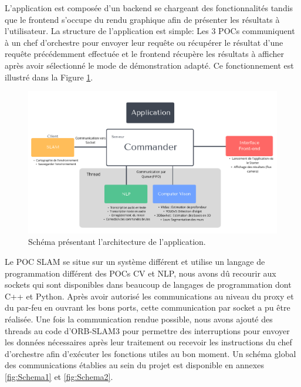 \documentclass[11pt]{article}
\begin{document}
        L'application est composée d'un backend se chargeant des fonctionnalités tandis que le frontend s'occupe du rendu
        graphique afin de présenter les résultats à l'utilisateur. La structure de l'application est simple: Les 3 POCs communiquent à un 
        chef d'orchestre pour envoyer leur requête ou récupérer le résultat d'une requête précédemment effectuée et le frontend récupère
        les résultats à afficher après avoir sélectionné le mode de démonstration adapté. Ce fonctionnement est illustré dans la 
        Figure \ref{fig:Structure}.

        \begin{figure}[hbt]  
          \includegraphics[width=\textwidth]{StructureApp.png}    
          \caption{Schéma présentant l'architecture de l'application.}
          \label{fig:Structure}
        \end{figure} 

        Le POC SLAM se situe sur un système différent et utilise un langage de programmation différent des POCs CV et NLP, nous avons dû
        recourir aux sockets qui sont disponibles dans beaucoup de langages de programmation dont C++ et Python. Après avoir autorisé les 
        communications au niveau du proxy et du par-feu en ouvrant les bons ports, cette communication par socket a pu être réalisée.
        Une fois la communication rendue possible, nous avons ajouté des threads au code d'ORB-SLAM3 pour permettre des interruptions
        pour envoyer les données nécessaires après leur traitement ou recevoir les instructions du chef d'orchestre
        afin d'exécuter les fonctions utiles au bon moment. Un schéma global des communications établies au sein du projet est disponible en 
        annexes \ref{fig:Schema1} et \ref{fig:Schema2}.      
\end{document}
